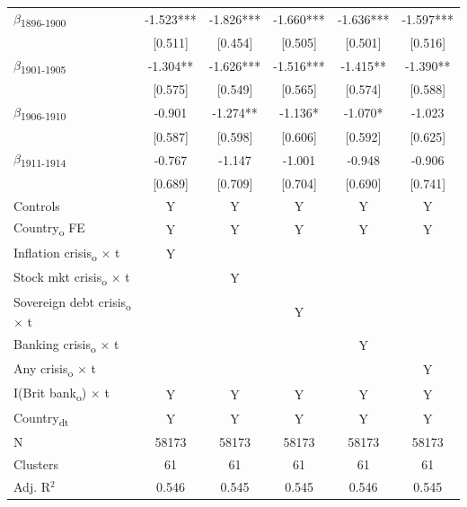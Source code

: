 {\begin{tabular}{l*{5}{c}}
$\beta$\textsubscript{1896-1900}&      -1.523***&      -1.826***&      -1.660***&      -1.636***&      -1.597***\\
            &     [0.511]   &     [0.454]   &     [0.505]   &     [0.501]   &     [0.516]   \\
$\beta$\textsubscript{1901-1905}&      -1.304** &      -1.626***&      -1.516***&      -1.415** &      -1.390** \\
            &     [0.575]   &     [0.549]   &     [0.565]   &     [0.574]   &     [0.588]   \\
$\beta$\textsubscript{1906-1910}&      -0.901   &      -1.274** &      -1.136*  &      -1.070*  &      -1.023   \\
            &     [0.587]   &     [0.598]   &     [0.606]   &     [0.592]   &     [0.625]   \\
$\beta$\textsubscript{1911-1914}&      -0.767   &      -1.147   &      -1.001   &      -0.948   &      -0.906   \\
            &     [0.689]   &     [0.709]   &     [0.704]   &     [0.690]   &     [0.741]   \\
Controls    &           Y   &           Y   &           Y   &           Y   &           Y   \\
Country\textsubscript{o} FE&           Y   &           Y   &           Y   &           Y   &           Y   \\
Inflation crisis\textsubscript{o} $\times$ t&           Y   &               &               &               &               \\
Stock mkt crisis\textsubscript{o} $\times$ t&               &           Y   &               &               &               \\
Sovereign debt crisis\textsubscript{o} $\times$ t&               &               &           Y   &               &               \\
Banking crisis\textsubscript{o} $\times$ t&               &               &               &           Y   &               \\
Any crisis\textsubscript{o} $\times$ t&               &               &               &               &           Y   \\
I(Brit bank\textsubscript{o}) $\times$ t&           Y   &           Y   &           Y   &           Y   &           Y   \\
Country\textsubscript{dt}&           Y   &           Y   &           Y   &           Y   &           Y   \\
\midrule
N           &       58173   &       58173   &       58173   &       58173   &       58173   \\
Clusters    &          61   &          61   &          61   &          61   &          61   \\
Adj. R{$^2$}&       0.546   &       0.545   &       0.545   &       0.546   &       0.545   \\
\bottomrule
\end{tabular}
}
